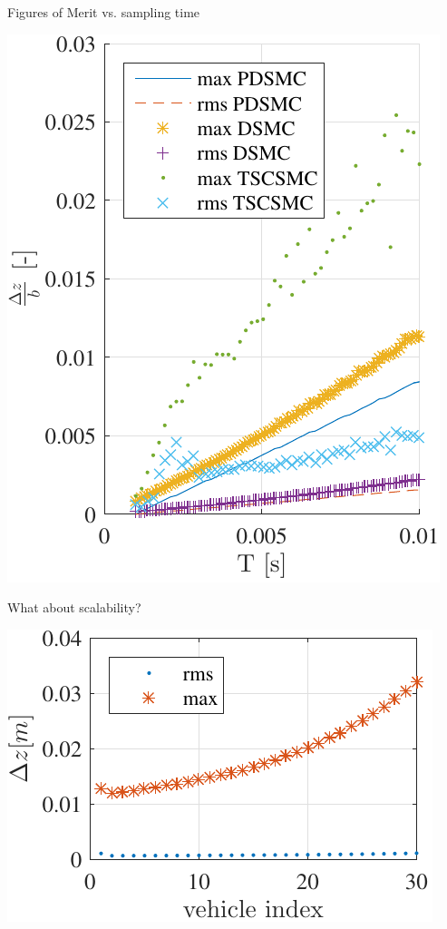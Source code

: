 \documentclass[12pt,svgnames,table,draft=false]{beamer}
\begin{document}
\begin{frame}{Figures of Merit vs. sampling time}

\begin{center}
\includegraphics[height=0.8\paperheight]{error-z-vs-samplingtime.pdf}    

\end{center}\end{frame}

\begin{frame}{What about scalability?}
\centering
\begin{center}
\includegraphics[width=\columnwidth]{erroramplification-DSMC-100Hz-TIMESCALESEPARATION-turbulence=1-turbulenceonlyfirstUAS} 

\end{center}\end{frame}
\end{document}
